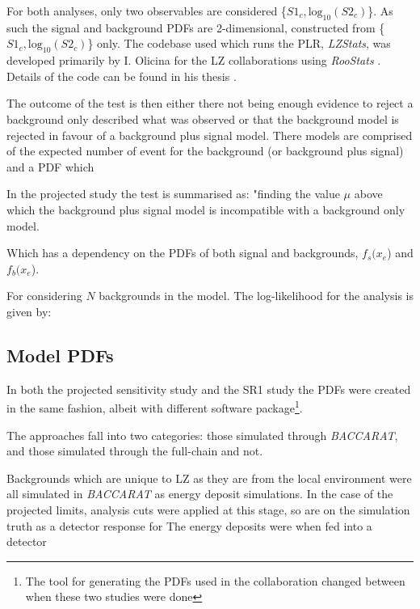 \par
For both analyses, only two observables are considered \{$S1_c,\text{log}_{10}(S2_c)$\}.
As such the signal and background PDFs are 2-dimensional, constructed from \{$S1_c,\text{log}_{10}(S2_c)$\} only.
The codebase used which runs the PLR, \textit{LZStats}, was developed primarily by I. Olicina for the LZ collaborations using \textit{RooStats} \cite{roostats_ref}.
Details of the code can be found in his thesis \cite{LZ_Ibles_LZStats_Thesis_ref}.


\iffalse
The outcome of the test is then either there not being enough evidence to reject a background only described what was observed or that the background model is rejected in favour of a background plus signal model.
There models are comprised of the expected number of event for the background (or background plus signal) and a PDF which 


\par
In the projected study the test is summarised as:
"finding the value $\mu$ above which the background plus signal model is incompatible with a background only model.

Which has a dependency on the PDFs of both signal and backgrounds, $f_s($\textbf{$x_e$}) and $f_b($\textbf{$x_e$}).

For considering $N$ backgrounds in the model.
The log-likelihood for the analysis is given by:



\subsection{Model PDFs}
\par
In both the projected sensitivity study and the SR1 study the PDFs were created in the same fashion, albeit with different software package\footnote{The tool for generating the PDFs used in the collaboration changed between when these two studies were done}.



The approaches fall into two categories: those simulated through \textit{BACCARAT}, and those  simulated through the full-chain and not.

\par
Backgrounds which are unique to LZ as they are from the local environment were all simulated in \textit{BACCARAT} as energy deposit simulations.
In the case of the projected limits, analysis cuts were applied at this stage, so are on the simulation truth as a detector response for 
The energy deposits were when fed into a detector


